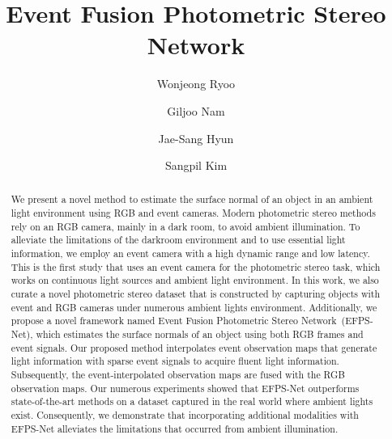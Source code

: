 \documentclass[preprint,12pt,authoryear]{elsarticle}
\begin{document}
\begin{frontmatter}

\title{Event Fusion Photometric Stereo Network}

\author[inst1]{Wonjeong Ryoo}
\author[inst3]{Giljoo Nam}
\author[inst2]{Jae-Sang Hyun}
\author[inst1]{Sangpil Kim}
\address[inst1]{Department of Artificial Intelligence, Korea University, Seoul, 02841, South Korea}
\address[inst2]{School of Mechanical Engineering, Yonsei University, Seoul, 03722, South Korea}
\address[inst3]{Reality Labs Research, Meta, USA}

\begin{abstract}
We present a novel method to estimate the surface normal of an object in an ambient light environment using RGB and event cameras.
Modern photometric stereo methods rely on an RGB camera, mainly in a dark room, to avoid ambient illumination.
To alleviate the limitations of the darkroom environment and to use essential light information, we employ an event camera with a high dynamic range and low latency. 
This is the first study that uses an event camera for the photometric stereo task, which works on continuous light sources and ambient light environment. 
In this work, we also curate a novel photometric stereo dataset that is constructed by capturing objects with event and RGB cameras under numerous ambient lights environment.
Additionally, we propose a novel framework named Event Fusion Photometric Stereo Network~(EFPS-Net), which estimates the surface normals of an object using both RGB frames and event signals.
Our proposed method interpolates event observation maps that generate light information with sparse event signals to acquire fluent light information.
Subsequently, the event-interpolated observation maps are fused with the RGB observation maps. 
Our numerous experiments showed that EFPS-Net outperforms state-of-the-art methods on a dataset captured in the real world where ambient lights exist.
Consequently, we demonstrate that incorporating additional modalities with EFPS-Net alleviates the limitations that occurred from ambient illumination.
\end{abstract}



\end{frontmatter}
\end{document}
